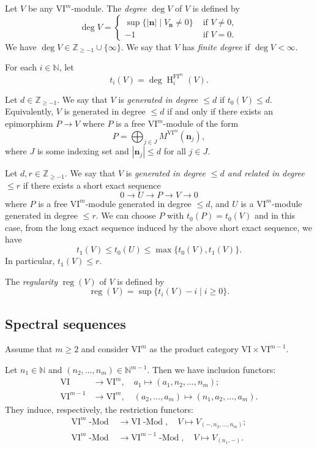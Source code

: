 \documentclass{amsart}
\numberwithin{equation}{section}
\DeclareMathOperator{\reg}{reg}
\DeclareMathOperator{\Mod}{-Mod}
\DeclareMathOperator{\HH}{H}
\newcommand{\N}{{\mathbb{N}}}
\newcommand{\VI}{{\mathrm{VI}}}
\newcommand{\FI}{{\mathrm{FI}}}
\newcommand{\ZZ}{{\mathbb{Z}_{\geqslant -1}}}
\begin{document}
Let $V$ be any $\VI^m$-module. The \emph{degree} $\deg V$ of $V$ is defined by 
\[ \deg V = \begin{cases} 
               \sup \{ |\mathbf{n}| \mid V_\mathbf{n} \neq 0 \} & \mbox{ if } V\neq 0,\\
               -1 & \mbox{ if } V=0.
            \end{cases} \]
We have $\deg V \in \ZZ \cup \{\infty\}$. We say that $V$ has \emph{finite degree} if $\deg V < \infty$. 

For each $i\in \N$, let 
\[ t_i(V) = \deg \HH^{\FI^m}_i(V). \] 

Let $d\in\ZZ$. We say that $V$ is \emph{generated in degree $\leqslant d$} if $t_0(V) \leqslant d$. Equivalently, $V$ is generated in degree $\leqslant d$ if and only if there exists an epimorphism $P \to V$ where $P$ is a free $\VI^m$-module of the form 
\[ P = \bigoplus_{j\in J} M^{\VI^m}(\mathbf{n}_j), \]
where $J$ is some indexing set and $|\mathbf{n}_j| \leqslant d$ for all $j\in J$.

Let $d,r\in\ZZ$. We say that $V$ is \emph{generated in degree $\leqslant d$ and related in degree $\leqslant r$} if there exists a short exact sequence
\[ 0 \to U \to P \to V \to 0 \]
where $P$ is a free $\VI^m$-module generated in degree $\leqslant d$, and $U$ is a $\VI^m$-module generated in degree $\leqslant r$. We can choose $P$ with $t_0(P)=t_0(V)$ and in this case, from the long exact sequence induced by the above short exact sequence, we have 
\[ t_1(V) \leqslant t_0(U) \leqslant \max\{ t_0(V), t_1(V) \}. \]
In particular, $t_1(V) \leqslant r$.  

The \emph{regularity} $\reg(V)$ of $V$ is defined by 
\[ \reg(V) = \sup \{ t_i(V)-i \mid i\geqslant 0\}. \]

\subsection{Spectral sequences}
Assume that $m\geqslant 2$ and consider $\VI^m$ as the product category $\VI\times \VI^{m-1}$. 

Let $n_1\in \N$ and $(n_2, \ldots, n_m)\in \N^{m-1}$. Then we have inclusion functors:
\begin{align*}   
   \VI &\to \VI^m, \quad a_1 \mapsto (a_1, n_2, \ldots, n_m);\\
   \VI^{m-1} &\to \VI^m, \quad (a_2, \ldots, a_m) \mapsto (n_1, a_2, \ldots, a_m).
\end{align*}
They induce, respectively, the restriction functors:
\begin{align*}   
   \VI^m\Mod &\to \VI\Mod, \quad V\mapsto V_{(-, n_2, \ldots, n_m)};\\
   \VI^m\Mod &\to \VI^{m-1}\Mod, \quad V\mapsto V_{(n_1, -)}.
\end{align*}
\end{document}
